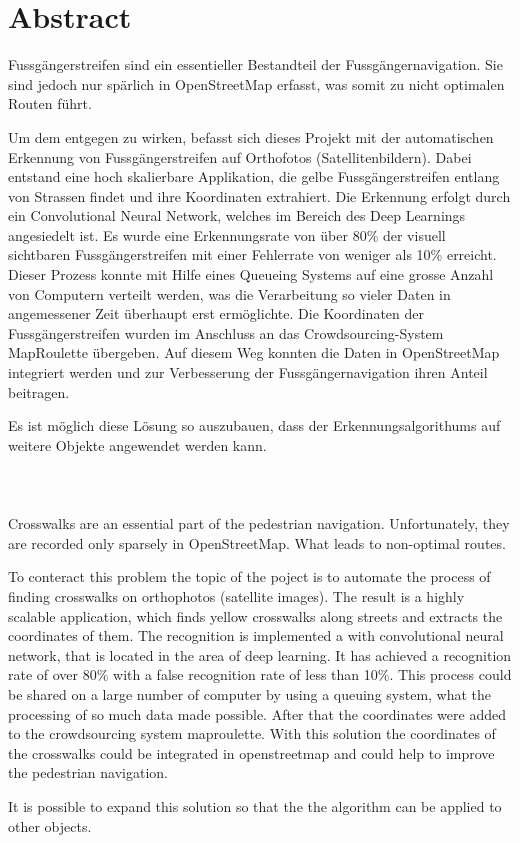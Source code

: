 \section{Abstract}

Fussgängerstreifen sind ein essentieller Bestandteil der Fussgängernavigation. Sie sind jedoch nur spärlich in OpenStreetMap erfasst, was somit zu nicht optimalen Routen führt.

Um dem entgegen zu wirken,  befasst sich dieses Projekt mit der automatischen Erkennung von Fussgängerstreifen auf Orthofotos (Satellitenbildern). 
Dabei entstand eine hoch skalierbare Applikation, die gelbe Fussgängerstreifen entlang von Strassen findet und ihre Koordinaten extrahiert. Die Erkennung erfolgt durch ein Convolutional Neural Network, welches im Bereich des Deep Learnings angesiedelt ist.
Es wurde eine Erkennungsrate von über 80\% der visuell sichtbaren Fussgängerstreifen mit einer Fehlerrate von weniger als 10\% erreicht. Dieser Prozess konnte mit Hilfe eines Queueing Systems auf eine grosse Anzahl von Computern verteilt werden, was die Verarbeitung so vieler Daten in angemessener Zeit überhaupt erst ermöglichte. Die Koordinaten der Fussgängerstreifen wurden im Anschluss an das Crowdsourcing-System MapRoulette übergeben. Auf diesem Weg konnten die Daten in OpenStreetMap integriert werden und zur Verbesserung der Fussgängernavigation ihren Anteil beitragen.

Es ist möglich diese Lösung so auszubauen, dass der Erkennungsalgorithums auf weitere Objekte angewendet werden kann.\\ \\ \\ \\




Crosswalks are an essential part of the pedestrian navigation. Unfortunately, they are recorded only sparsely in OpenStreetMap. What leads to non-optimal routes.

To conteract this problem the topic of the poject is to automate the process of finding crosswalks on orthophotos (satellite images). The result is a highly scalable application, which finds yellow crosswalks along streets and extracts the coordinates of them. The recognition is implemented a with convolutional neural network, that is located in the area of deep learning. It has achieved a recognition rate of over 80\% with a false recognition rate of less than 10\%. This process could be shared on a large number of computer by using a queuing system, what the processing of so much data made possible. After that the coordinates were added to the crowdsourcing system maproulette. With this solution the coordinates of the crosswalks could be integrated in openstreetmap and could help to improve the pedestrian navigation.

It is possible to expand this solution so that the the algorithm can be applied to other objects.

